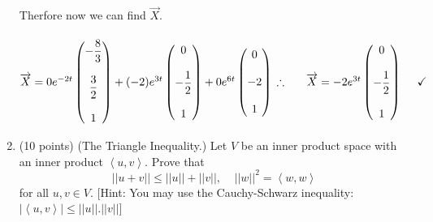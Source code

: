 \documentclass[fleqn]{article}
\begin{document}
\begin{enumerate}
{        Therfore now we can find $\overrightarrow{X}$.
        \\
        \\
        $
          \overrightarrow{X}=0 e^{-2 t} \begin{pmatrix}
            -\dfrac{8}{3}
            \\
            \\
            \dfrac{3}{2}
            \\
            \\
            1
          \end{pmatrix}+(-2) e^{3 t} \begin{pmatrix}
            0
            \\
            \\
            -\dfrac{1}{2}
            \\
            \\
            1
          \end{pmatrix}+0 e^{6 t} \begin{pmatrix}
            0
            \\
            \\
            -2
            \\
            \\
            1
          \end{pmatrix}
          \\
          \\
          \\
          \\
          \therefore ~~~~~ \overrightarrow{X}=-2e^{3 t} \begin{pmatrix}
            0
            \\
            \\
            -\dfrac{1}{2}
            \\
            \\
            1
          \end{pmatrix} ~~~~ \checkmark
        $
      }


    \item (10 points) (The Triangle Inequality.) Let $V$ be an inner product space with an inner product
    $\left\langle u, v\right\rangle$. Prove that 
    $$
      ||u+v|| \leq ||u||+||v||, ~~~~~ ||w||^2=\left\langle w, w\right\rangle
    $$
    for all $u,v \in V$.  [Hint: You may use the Cauchy-Schwarz inequality: $|\left\langle u, v\right\rangle | \leq ||u||.||v||$]

          


  \end{enumerate}
\end{document}
